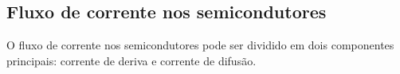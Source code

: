 \renewcommand*{\thefootnote}{\fnsymbol{footnote}}
\renewcommand*{\thefootnote}{\arabic{footnote}}

\subsection[1.2 Fluxo de corrente nos semicondutores]{\hspace*{0.075 em}\raisebox{0.2 em}{$\pmb{\drsh}$} Fluxo de corrente nos semicondutores}
\label{subsec:current-flow-semiconductors}

O fluxo de corrente nos semicondutores pode ser dividido em dois componentes principais: corrente de deriva e corrente de difusão.

